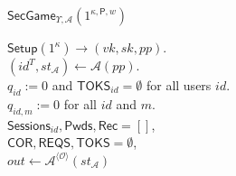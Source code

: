 \documentclass[conference]{IEEEtran}
\newcommand{\cA}{\mathcal{A}}
\newcommand{\cO}{\mathcal{O}}
\newcommand{\secparameter}{\kappa}
\newcommand{\sk}{sk}
\newcommand{\vk}{vk}
\newcommand{\pp}{pp}
\newcommand{\uid}{id}
\newcommand{\sP}{\mathsf{P}}
\begin{document}


$\mathsf{SecGame}_{\Upsilon, \cA}(1^{\secparameter, \sP, w})$
\label{obtain-game}
\begin{multicols}{2}
\raggedright
\scriptsize
 
\noindent $\mathsf{Setup}(1^{\secparameter}) \rightarrow (\vk,\sk,\pp)$.\\        
$(\uid^{T}, st_{\cA}) \longleftarrow \cA(\pp)$.\\
$q_{\uid} := 0$ and $\mathsf{TOKS}_{\uid} = \emptyset$ for all users $\uid$.\\
$q_{\uid,m} := 0$ for all $\uid$ and $m$.\\    
$\mathsf{Sessions}_{\uid}, \mathsf{Pwds}, \mathsf{Rec} = []$,
\\
$\mathsf{COR}, \mathsf{REQS}, \mathsf{TOKS} = \emptyset$,
\\ 
$out \leftarrow \cA^{\langle \cO \rangle}(st_{\cA})$\\         
\end{multicols}
\end{document}
